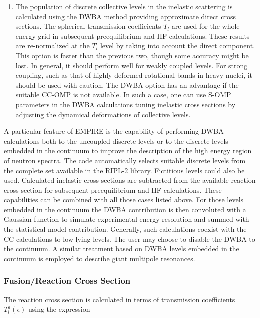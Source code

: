 \begin{enumerate}
\item The population of discrete collective levels in the inelastic
scattering is calculated using the DWBA method providing approximate direct
cross sections. The spherical transmission coefficients $T_{l}$ are used for
the whole energy grid in subsequent preequilibrium and HF calculations.
These results are re-normalized at the $T_{l}$ level by taking into account
the direct component. This option is faster than the previous two, though
some accuracy might be lost. In general, it should perform well for weakly
coupled levels. For strong coupling, such as that of highly deformed
rotational bands in heavy nuclei, it should be used with caution. The DWBA
option has an advantage if the suitable CC-OMP is not available. In such a
case, one can use S-OMP parameters in the DWBA calculations tuning inelastic
cross sections by adjusting the dynamical deformations of collective levels.
\end{enumerate}

\bigskip

A particular feature of EMPIRE is the capability of performing DWBA
calculations both to the uncoupled discrete levels or to the discrete levels
embedded in the continuum to improve the description of the high energy
region of neutron spectra. The code automatically selects suitable discrete
levels from the complete set available in the RIPL-2 library. Fictitious
levels could also be used. Calculated inelastic cross sections are
subtracted from the available reaction cross section for subsequent
preequilibrium and HF calculations. These capabilities can be combined with
all those cases listed above. For those levels embedded in the continuum the
DWBA contribution is then convoluted with a Gaussian function to simulate
experimental energy resolution and summed with the statistical model
contribution. Generally, such calculations coexist with the CC calculations
to low lying levels. The user may choose to disable the DWBA to the
continuum. A similar treatment based on DWBA levels embedded in the
continuum is employed to describe giant multipole resonances.

\subsubsection{Fusion/Reaction Cross Section\label{sec:fusion}}

The reaction cross section is calculated in terms of transmission
coefficients $T_{l}^{a}(\epsilon)$ using the expression

